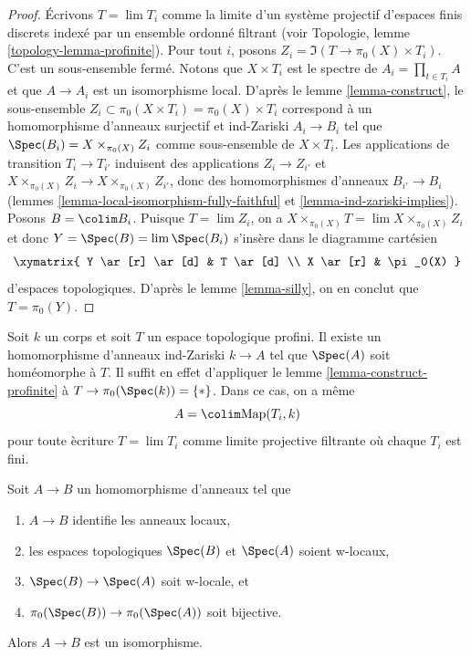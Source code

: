 \begin{proof}
\'Ecrivons $T = \lim T_i$ comme la limite d'un syst\`eme projectif d'espaces
finis discrets index\'e par un ensemble ordonn\'e filtrant (voir
Topologie, lemme \ref{topology-lemma-profinite}). Pour tout $i$, posons
$Z_i = \Im(T \to \pi_0(X) \times T_i)$. C'est un sous-ensemble ferm\'e.
Notons que $X \times T_i$ est le spectre de $A_i = \prod_{t \in T_i} A$
et que $A \to A_i$ est un isomorphisme local. D'apr\`es le lemme \ref{lemma-construct},
le sous-ensemble $Z_i \subset \pi_0(X \times T_i) = \pi_0(X) \times T_i$
correspond \`a un homomorphisme d'anneaux surjectif et ind-Zariski $A_i \to B_i$
tel que $\Spec(B_i) = X \times_{\pi_0(X)} Z_i$ comme sous-ensemble de
$X \times T_i$. Les applications de transition $T_i \to T_{i'}$ induisent des applications
$Z_i \to Z_{i'}$ et $X \times_{\pi_0(X)} Z_i \to X \times_{\pi_0(X)} Z_{i'}$,
donc des homomorphismes d'anneaux $B_{i'} \to B_i$
(lemmes \ref{lemma-local-isomorphism-fully-faithful} et
\ref{lemma-ind-zariski-implies}).
Posons $B = \colim B_i$. Puisque $T = \lim Z_i$, on a
$X \times_{\pi_0(X)} T = \lim  X \times_{\pi_0(X)} Z_i$
et donc $Y = \Spec(B) = \lim \Spec(B_i)$
s'ins\`ere dans le diagramme cart\'esien
$$
\xymatrix{
Y \ar[r] \ar[d] & T \ar[d] \\
X \ar[r] & \pi_0(X)
}
$$
d'espaces topologiques. D'apr\`es le lemme \ref{lemma-silly},
on en conclut que $T = \pi_0(Y)$.
\end{proof}

\begin{example}
\label{example-construct-space}
Soit $k$ un corps et soit $T$ un espace topologique profini.
Il existe un homomorphisme d'anneaux ind-Zariski $k \to A$ tel que
$\Spec(A)$ soit hom\'eomorphe \`a $T$. Il suffit en effet d'appliquer le
lemme \ref{lemma-construct-profinite} \`a $T \to \pi_0(\Spec(k)) = \{*\}$.
Dans ce cas, on a m\^eme
$$
A = \colim \text{Map}(T_i, k)
$$
pour toute \`ecriture $T = \lim T_i$ comme limite projective filtrante o\`u chaque $T_i$ est fini.
\end{example}

\begin{lemma}
\label{lemma-w-local-morphism-equal-points-stalks-is-iso}
Soit $A \to B$ un homomorphisme d'anneaux tel que
\begin{enumerate}
\item $A \to B$ identifie les anneaux locaux,
\item les espaces topologiques $\Spec(B)$ et $\Spec(A)$ soient w-locaux,
\item $\Spec(B) \to \Spec(A)$ soit w-locale, et
\item $\pi_0(\Spec(B)) \to \pi_0(\Spec(A))$ soit bijective.
\end{enumerate}
Alors $A \to B$ est un isomorphisme.
\end{lemma}

